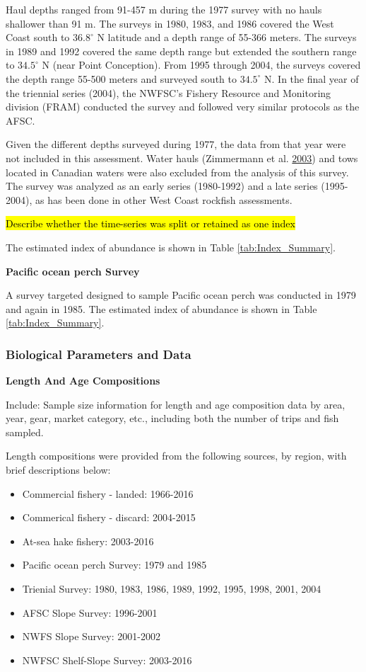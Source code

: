 \documentclass[12pt,]{article}
\begin{document}
Haul depths ranged from 91-457 m during the 1977 survey with no hauls
shallower than 91 m. The surveys in 1980, 1983, and 1986 covered the
West Coast south to \(36.8^\circ\) N latitude and a depth range of
55-366 meters. The surveys in 1989 and 1992 covered the same depth range
but extended the southern range to \(34.5^\circ\) N (near Point
Conception). From 1995 through 2004, the surveys covered the depth range
55-500 meters and surveyed south to \(34.5^\circ\) N. In the final year
of the triennial series (2004), the NWFSC's Fishery Resource and
Monitoring division (FRAM) conducted the survey and followed very
similar protocols as the AFSC.

Given the different depths surveyed during 1977, the data from that year
were not included in this assessment. Water hauls (Zimmermann et al.
\protect\hyperlink{ref-zimmermann_influence_2003}{2003}) and tows
located in Canadian waters were also excluded from the analysis of this
survey. The survey was analyzed as an early series (1980-1992) and a
late series (1995-2004), as has been done in other West Coast rockfish
assessments.

\hl{Describe whether the time-series was split or retained as one index}

The estimated index of abundance is shown in Table
\ref{tab:Index_Summary}.

\textbf{Pacific ocean perch Survey}

A survey targeted designed to sample Pacific ocean perch was conducted
in 1979 and again in 1985. The estimated index of abundance is shown in
Table \ref{tab:Index_Summary}.

\subsubsection{Biological Parameters and
Data}\label{biological-parameters-and-data}

\textbf{Length And Age Compositions}

Include: Sample size information for length and age composition data by
area, year, gear, market category, etc., including both the number of
trips and fish sampled.

Length compositions were provided from the following sources, by region,
with brief descriptions below:

\begin{itemize}[noitemsep,nolistsep,topsep=0pt]
  \item Commercial fishery - landed: 1966-2016
  \item Commerical fishery - discard: 2004-2015
  \item At-sea hake fishery: 2003-2016
  \item Pacific ocean perch Survey: 1979 and 1985
  \item Trienial Survey: 1980, 1983, 1986, 1989, 1992, 1995, 1998, 2001, 2004
  \item AFSC Slope Survey: 1996-2001
  \item NWFS Slope Survey: 2001-2002
  \item NWFSC Shelf-Slope Survey: 2003-2016
\end{itemize}
\end{document}
